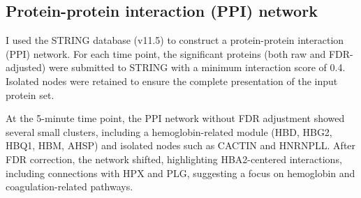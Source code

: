 \documentclass{article}
\begin{document}
    \subsection{Protein-protein interaction (PPI) network}

      I used the STRING database (v11.5) to construct a protein-protein interaction (PPI) network. For each time point, the significant proteins (both raw and FDR-adjusted) were submitted to STRING with a minimum interaction score of 0.4. Isolated nodes were retained to ensure the complete presentation of the input protein set.

      At the 5-minute time point, the PPI network without FDR adjustment showed several small clusters, including a hemoglobin-related module (HBD, HBG2, HBQ1, HBM, AHSP) and isolated nodes such as CACTIN and HNRNPLL. After FDR correction, the network shifted, highlighting HBA2-centered interactions, including connections with HPX and PLG, suggesting a focus on hemoglobin and coagulation-related pathways.
\end{document}
